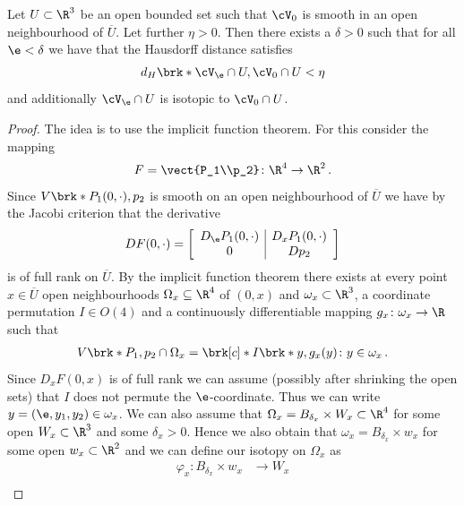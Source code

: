 \begin{proposition}\label{pr:n3_polynomial_convergenceSmoothSet}
  Let $U\subset\R^3$ be an open bounded set such that $\cV_0$ is smooth
  in an open neighbourhood of $\overline{U}$. Let further $\eta>0$.
  Then there exists a $\delta>0$ such that for all $\e<\delta$ we have that the Hausdorff distance
  satisfies
  \begin{align*}
    d_H\brk*{\cV_\e\cap U,\cV_0\cap U}<\eta
  \end{align*}
  and additionally $\cV_\e\cap U$ is isotopic to $\cV_0\cap U$.
\end{proposition}
\begin{proof}
  The idea is to use the implicit function theorem. For this consider the mapping
  \begin{align*}
    F=\vect{P_1\\p_2}\colon \R^4\to\R^2\,.
  \end{align*}
  Since $V\brk*{P_1(0,\cdot),p_2}$ is smooth on an open neighbourhood of $\overline{U}$
  we have by the Jacobi criterion that the derivative
  \begin{align}
    DF(0,\cdot) = \left[\begin{array}{c|c}
        D_\e P_1(0,\cdot)&D_x P_1(0,\cdot)\\
        0&D p_2
      \end{array}\right]\label{eq:n3_polynomial_homotopic_df}
  \end{align}
  is of full rank on $\overline{U}$.
  By the implicit function theorem there exists at every point $x\in\overline{U}$ open neighbourhoods
  $\Omega_x\subseteq \R^4$ of $(0,x)$ and $\omega_x\subset\R^3$, a coordinate permutation $I\in O(4)$
  and a continuously differentiable mapping $g_x\colon\omega_x\to\R$ such that
  \begin{align*}
    V\brk*{P_1,p_2}\cap \Omega_x=\brk[c]*{I\brk*{y,g_x(y)}\colon y\in\omega_x}\,.
  \end{align*}
  Since $D_xF(0,x)$ is of full rank we can assume (possibly after shrinking the open sets) that $I$ does not permute the $\e$-coordinate.
  Thus we can write $y=(\e,y_1,y_2)\in\omega_x$.
  We can also assume that $\Omega_x=B_{\delta_x}\times W_x\subset\R^4$ for some open $W_x\subset\R^3$ and 
  some $\delta_x>0$.
  Hence we also obtain that $\omega_x=B_{\delta_x}\times w_x$ for some open $w_x\subset\R^2$ and we can define our
  isotopy on $\Omega_x$ as
  \begin{align*}
    \varphi_x\colon B_{\delta_x}\times w_x&\to W_x\\

\end{align*}
\end{proof}
